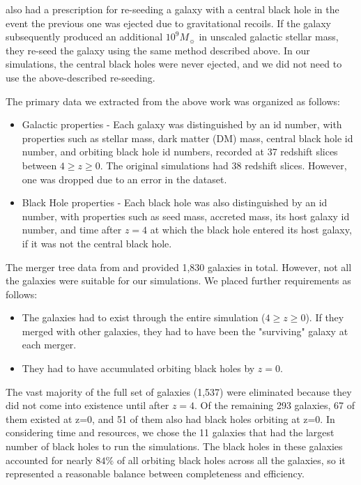 \documentclass[fleqn,usenatbib,useAMS]{mnras}
\begin{document}
\citet{2015ApJ...799..178K} also had a prescription for re-seeding a galaxy with a central black hole in the event the previous one was ejected due to gravitational recoils. If the galaxy subsequently produced an additional $10^9M_{\sun}$ in unscaled galactic stellar mass, they re-seed the galaxy using the same method described above.  In our simulations, the central black holes were never ejected, and we did not need to use the above-described re-seeding.

The primary data we extracted from the above work was organized as follows:
\begin{itemize}
    \item Galactic properties - Each galaxy was distinguished by an id number, with properties such as stellar mass, dark matter (DM) mass, central black hole id number, and orbiting black hole id numbers, recorded at 37 redshift slices between $4\geq z \geq0$. The original \citet{2015ApJ...799..178K} simulations had 38 redshift slices.  However, one was dropped due to an error in the dataset.
    \item Black Hole properties - Each black hole was also distinguished by an id number, with properties such as seed mass, accreted mass, its host galaxy id number, and time after $z=4$ at which the black hole entered its host galaxy, if it was not the central black hole.
\end{itemize}

The merger tree data from \citet{2012MNRAS.425..641L} and \citet{2015ApJ...799..178K} provided 1,830 galaxies in total.  However, not all the galaxies were suitable for our simulations.  We placed further requirements as follows:
\begin{itemize}
\item The galaxies had to exist through the entire simulation ($4\geq z \geq 0$).  If they merged with other galaxies, they had to have been the "surviving" galaxy at each merger.
\item They had to have accumulated orbiting black holes by $z = 0$.
\end{itemize}

The vast majority of the full set of galaxies (1,537) were eliminated because they did not come into existence until after $z=4$.  Of the remaining 293 galaxies, 67 of them existed at z=0, and 51 of them also had black holes orbiting at z=0.  In considering time and resources, we chose the 11 galaxies that had the largest number of black holes to run the simulations.  The black holes in these galaxies accounted for nearly $84{\%}$ of all orbiting black holes across all the galaxies, so it represented a reasonable balance between completeness and efficiency.
\end{document}
